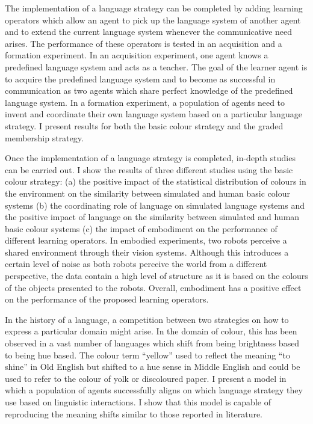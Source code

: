 The implementation of a language strategy can be completed by adding
learning operators which allow an agent to pick up the language system
of another agent and to extend the current language system whenever
the communicative need arises. The performance of these operators is
tested in an acquisition and a formation experiment. In an acquisition
experiment, one agent knows a predefined language system and acts as a
teacher. The goal of the learner agent is to acquire the predefined
language system and to become as successful in communication as two
agents which share perfect knowledge of the predefined language
system. In a formation experiment, a population of agents need to
invent and coordinate their own language system based on a particular
language strategy. I present results for both the basic colour
strategy and the graded membership strategy.

Once the implementation of a language strategy is completed, in-depth
studies can be carried out. I show the results of three different
studies using the basic colour strategy: (a) the positive impact of
the statistical distribution of colours in the environment on the
similarity between simulated and human basic colour systems (b) the
coordinating role of language on simulated language systems and the
positive impact of language on the similarity between simulated and
human basic colour systems (c) the impact of embodiment on the
performance of different learning operators. In embodied experiments,
two robots perceive a shared environment through their vision
systems. Although this introduces a certain level of noise as both
robots perceive the world from a different perspective, the data
contain a high level of structure as it is based on the colours of
the objects presented to the robots. Overall, embodiment has a
positive effect on the performance of the proposed learning operators.

In the history of a language, a competition between two strategies on
how to express a particular domain might arise. In the domain of
colour, this has been observed in a vast number of languages which
shift from being brightness based to being hue based. The colour term
``yellow'' used to reflect the meaning ``to shine'' in Old English but
shifted to a hue sense in Middle English and could be used to refer to
the colour of yolk or discoloured paper. I present a model in which a
population of agents successfully aligns on which language strategy
they use based on linguistic interactions. I show that this model is
capable of reproducing the meaning shifts similar to those reported in
literature.

